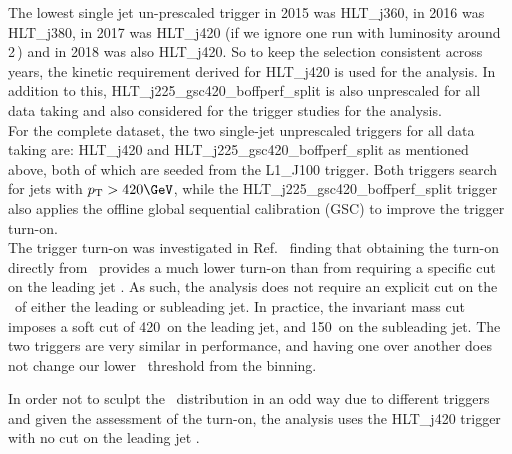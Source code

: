 The lowest single jet un-prescaled trigger in 2015 was HLT\_j360, in
2016 was HLT\_j380, in 2017 was HLT\_j420 (if we ignore one run with
luminosity around 2\,\ipb ) and in 2018 was also HLT\_j420. So to keep
the selection consistent across years, the kinetic requirement derived
for HLT\_j420 is used for the analysis. In addition to this,
HLT\_j225\_gsc420\_boffperf\_split is also unprescaled for all data
taking and also considered for the trigger studies for the analysis. \\

For the complete \RunTwo dataset, the two single-jet unprescaled
triggers for all data taking are: HLT\_j420 and
HLT\_j225\_gsc420\_boffperf\_split as mentioned above, both of which are
seeded from the L1\_J100 trigger. Both triggers search for jets with
$\pT > 420 \GeV$, while the HLT\_j225\_gsc420\_boffperf\_split trigger
also applies the offline global sequential calibration (GSC) to improve
the trigger turn-on.\\

The trigger turn-on was investigated in Ref.~\cite{Nishu:2646455}
finding that  obtaining the turn-on directly from \mjj\ provides a much
lower turn-on than from requiring a specific cut on the leading jet \pT.
As such, the analysis does not require an explicit cut on the \pT\ of
either the leading or subleading jet. In practice, the invariant mass
cut imposes a soft cut of 420~\GeV on the leading jet, and 150~\GeV on
the subleading jet. The two triggers are very similar in performance,
and having one over another does not change our lower \mjj\ threshold
from the binning.


In order not to sculpt the \mjj\ distribution in an odd way due to
different triggers and given the assessment of the turn-on, the analysis
uses the HLT\_j420 trigger with no cut on the leading jet \pT.

